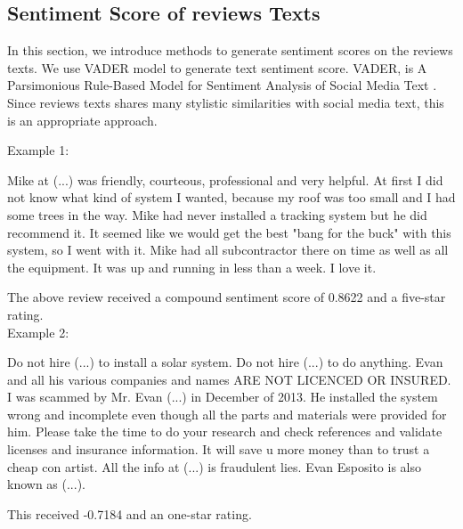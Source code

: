 \documentclass[msom,blindrev]{informs3}
\begin{document}
\subsection{Sentiment Score of reviews Texts}
In this section, we introduce methods to generate sentiment scores on the reviews texts. We use VADER model to generate text sentiment score. VADER, is A Parsimonious Rule-Based Model for Sentiment Analysis of Social Media Text \citep{hutto2014vader}. Since reviews texts shares many stylistic similarities with social media text, this is an appropriate approach. 




 Example 1: 
 \begin{displayquote}
Mike at (...) was friendly, courteous, professional and very helpful.  At first I did not know what kind of system I wanted, because my roof was too small and I had some trees in the way.  Mike had never installed a tracking system but he did recommend it.  It seemed like we would get the best "bang for the buck" with this system, so I went with it.  Mike had all subcontractor there on time as well as all the equipment.  It was up and running in less than a week.  I love it.  
\end{displayquote} 
The above review received a compound sentiment score of 0.8622 and a five-star rating. \\ 
 Example 2: 
\begin{displayquote}
Do not hire (...)  to install a solar system. Do not hire (...) to do anything. Evan   and all his various companies and names  ARE NOT LICENCED OR INSURED. I was scammed by Mr. Evan (...) in December of 2013. He installed the system wrong and incomplete even though all the parts and materials were provided for him. Please take the time to do your research and check references and validate licenses and insurance information. It will save u more money than to trust a cheap con artist. All the info at (...)  is fraudulent lies. Evan Esposito is also known as (...).
\end{displayquote}
This received -0.7184 and an one-star rating.  
\end{document}

